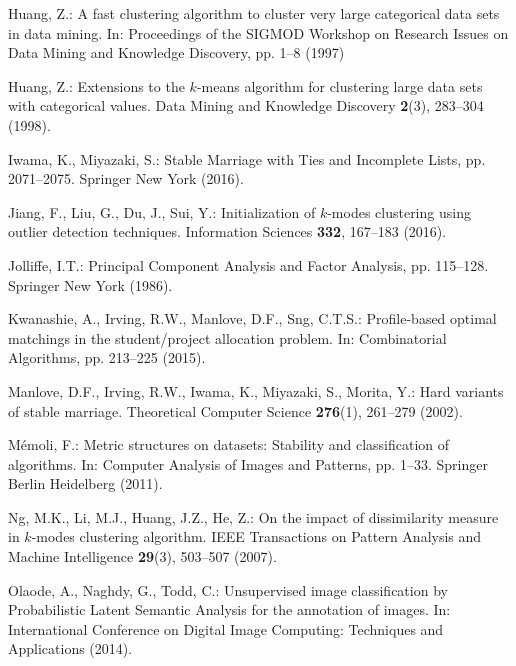 \documentclass[smallextended]{svjour3}
\begin{document}
\begin{thebibliography}{10}
Huang, Z.: A fast clustering algorithm to cluster very large categorical data
  sets in data mining.
\newblock In: Proceedings of the {SIGMOD} Workshop on Research Issues on Data
  Mining and Knowledge Discovery, pp. 1--8 (1997)

Huang, Z.: Extensions to the $k$-means algorithm for clustering large data sets
  with categorical values.
\newblock Data Mining and Knowledge Discovery \textbf{2}(3), 283--304 (1998).
\newblock {}

Iwama, K., Miyazaki, S.: Stable Marriage with Ties and Incomplete Lists, pp.
  2071--2075.
\newblock Springer New York (2016).
\newblock {}

Jiang, F., Liu, G., Du, J., Sui, Y.: Initialization of $k$-modes clustering
  using outlier detection techniques.
\newblock Information Sciences \textbf{332}, 167--183 (2016).
\newblock {}

Jolliffe, I.T.: Principal Component Analysis and Factor Analysis, pp. 115--128.
\newblock Springer New York (1986).
\newblock {}

Kwanashie, A., Irving, R.W., Manlove, D.F., Sng, C.T.S.: Profile-based optimal
  matchings in the student/project allocation problem.
\newblock In: Combinatorial Algorithms, pp. 213--225 (2015).
\newblock {}

Manlove, D.F., Irving, R.W., Iwama, K., Miyazaki, S., Morita, Y.: Hard variants
  of stable marriage.
\newblock Theoretical Computer Science \textbf{276}(1), 261--279 (2002).
\newblock {}

M{\'e}moli, F.: Metric structures on datasets: Stability and classification of
  algorithms.
\newblock In: Computer Analysis of Images and Patterns, pp. 1--33. Springer
  Berlin Heidelberg (2011).
\newblock {}

Ng, M.K., Li, M.J., Huang, J.Z., He, Z.: On the impact of dissimilarity measure
  in $k$-modes clustering algorithm.
\newblock IEEE Transactions on Pattern Analysis and Machine Intelligence
  \textbf{29}(3), 503--507 (2007).
\newblock {}

Olaode, A., Naghdy, G., Todd, C.: Unsupervised image classification by
  {P}robabilistic {L}atent {S}emantic {A}nalysis for the annotation of images.
\newblock In: International Conference on Digital Image Computing: Techniques
  and Applications (2014).
\newblock {}


\end{thebibliography}
\end{document}
